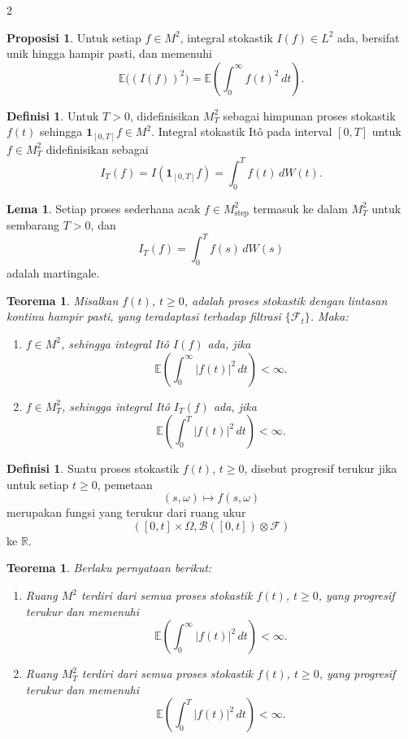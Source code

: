 \documentclass[a4paper,extrafontsizes, 9pt]{memoir}
\theoremstyle{definition}
\newtheorem{definisi}[kalstok]{Definisi}
\newtheorem{lemma}[kalstok]{Lema}
\newtheorem{proposisi}[kalstok]{Proposisi}
\theoremstyle{plain}
\newtheorem{teorema}[kalstok]{Teorema}
\theoremstyle{remark}
\begin{document}
\begin{multicols}{2}
  \begin{proposisi}
    Untuk setiap $f\in M^2$, integral stokastik $I(f)\in L^2$ ada, bersifat unik hingga hampir
    pasti, dan memenuhi
    \[\mathbb{E}\bigl((I(f))^2\bigr)=\mathbb{E}\left(\int_0^\infty f(t)^2\,dt\right).\]
  \end{proposisi}

  \begin{definisi}
    Untuk $T>0$, didefinisikan $M_T^2$ sebagai himpunan proses stokastik $f(t)$ sehingga
    $\mathbf{1}_{[0,T]}f\in M^2$. Integral stokastik It\^o pada interval $[0,T]$ untuk
    $f\in M_T^2$ didefinisikan sebagai
    \[I_T(f)=I(\mathbf{1}_{[0,T]}f)=\int_0^T f(t)\,dW(t).\]
  \end{definisi}

  \begin{lemma}
    Setiap proses sederhana acak $f\in M_{\text{step}}^2$ termasuk ke dalam $M_T^2$ untuk
    sembarang $T>0$, dan
    \[I_T(f)=\int_0^T f(s)\,dW(s)\]
    adalah martingale.
  \end{lemma}

  \begin{teorema}
    Misalkan $f(t)$, $t\ge 0$, adalah proses stokastik dengan lintasan kontinu hampir pasti,
    yang teradaptasi terhadap filtrasi $\{\mathcal{F}_t\}$. Maka:
    \begin{enumerate}[leftmargin=*, itemsep=0.5mm]
      \item $f\in M^2$, sehingga integral It\^o $I(f)$ ada, jika
            \[\mathbb{E}\left(\int_0^\infty |f(t)|^2\,dt\right)<\infty.\]
      \item $f\in M_T^2$, sehingga integral It\^o $I_T(f)$ ada, jika
            \[\mathbb{E}\left(\int_0^T |f(t)|^2\,dt\right)<\infty.\]
    \end{enumerate}
  \end{teorema}

  \begin{definisi}
    Suatu proses stokastik $f(t)$, $t\ge 0$, disebut progresif terukur jika untuk setiap
    $t\ge 0$, pemetaan
    \[(s,\omega)\mapsto f(s,\omega)\]
    merupakan fungsi yang terukur dari ruang ukur
    \[([0,t]\times\Omega,\mathcal{B}([0,t])\otimes\mathcal{F})\]
    ke $\mathbb{R}$.
  \end{definisi}

  \begin{teorema}
    Berlaku pernyataan berikut:
    \begin{enumerate}[leftmargin=*, itemsep=0.5mm]
      \item Ruang $M^2$ terdiri dari semua proses stokastik $f(t)$, $t\ge 0$, yang progresif
            terukur dan memenuhi
            \[\mathbb{E}\left(\int_0^\infty |f(t)|^2\,dt\right)<\infty.\]
      \item Ruang $M_T^2$ terdiri dari semua proses stokastik $f(t)$, $t\ge 0$, yang progresif
            terukur dan memenuhi
            \[\mathbb{E}\left(\int_0^T |f(t)|^2\,dt\right)<\infty.\]
    \end{enumerate}
  \end{teorema}


\end{multicols}
\end{document}
